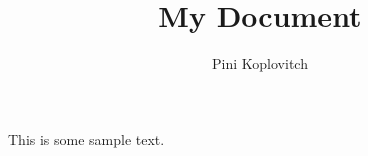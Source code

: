 \documentclass{template}
\title{My Document}
\author{Pini Koplovitch}
\begin{document}
    \maketitle

This is some sample text.
\end{document}

